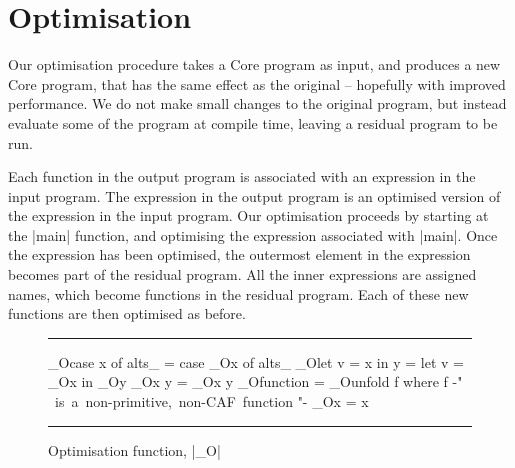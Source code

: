 \documentclass{llncs}
\newenvironment{fig}
    {\begin{figure}[tbp]\hrule}
    {\end{figure}}
\newcommand{\figend}{\hrule}
\begin{document}
\section{Optimisation}

Our optimisation procedure takes a Core program as input, and produces a new Core program, that has the same effect as the original -- hopefully with improved performance. We do not make small changes to the original program, but instead evaluate some of the program at compile time, leaving a residual program to be run.

Each function in the output program is associated with an expression in the input program. The expression in the output program is an optimised version of the expression in the input program. Our optimisation proceeds by starting at the |main| function, and optimising the expression associated with |main|. Once the expression has been optimised, the outermost element in the expression becomes part of the residual program. All the inner expressions are assigned names, which become functions in the residual program. Each of these new functions are then optimised as before.

\begin{fig}
\begin{code}
_O\<case x of alts_  \> =  case _O\<x\> \? of alts_
_O\<let v = x in y   \> =  let v = _O\<x\> \? in _O\<y\>
_O\<x y              \> =  _O\<x\> \? y
_O\<function         \> =  _O\<unfold f\>
                           where f {-" \hbox{ is a non-primitive, non-CAF function} "-}
_O\<x                \> =  x
\end{code}
\figend
\caption{Optimisation function, |_O|}
\label{fig:optimise}
\end{fig}
\end{document}

